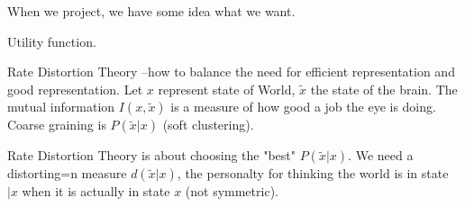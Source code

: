 \documentclass[]{article}
\begin{document}
When we project, we have some idea what we want.

Utility function.

Rate Distortion Theory --how to balance the need for efficient representation and good representation. Let ${x}$ represent state of World, ${\tilde{x}}$ the state of the brain. The mutual information $I(x,\tilde{x})$ is a measure of how good a job the eye is doing. Coarse graining is $P(\tilde{x}\vert x)$ (soft clustering).

Rate Distortion Theory is about choosing the "best" $P(\tilde{x}\vert x)$. We need a distorting=n measure $d(\tilde{x}\vert x)$, the personalty for thinking the world is in state $\vert x$ when it is actually in state $x$ (not symmetric).




\end{document}
